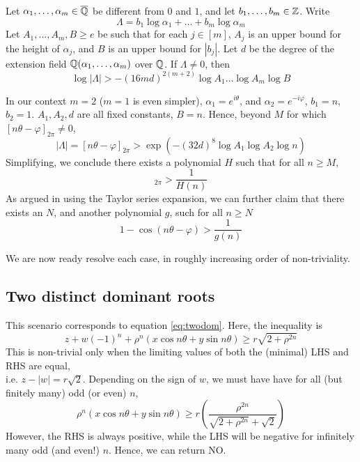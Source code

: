 \begin{theorem}[Baker]
\label{thm:baker}
Let $\alpha_1, \dots, \alpha_m \in \overline{\mathbb{Q}}$ be different from $0$ and $1$, and let $b_1, \dots, b_m \in \mathbb{Z}$. Write
$$
\Lambda = b_1 \log \alpha_1 + \dots + b_m \log \alpha_m
$$
Let $A_1, \dots, A_m, B \ge e$ be such that for each $j \in [m]$, $A_j$ is an upper bound for the height of $\alpha_j$, and $B$ is an upper bound for $|b_j|$. Let $d$ be the degree of the extension field $\mathbb{Q}(\alpha_1, \dots, \alpha_m)$ over $\mathbb{Q}$. If $\Lambda \ne 0$, then
$$
\log |\Lambda| > -(16md)^{2(m+2)}\log A_1 \dots \log A_m \log B
$$  
\end{theorem}

In our context $m=2$ ($m=1$ is even simpler), $\alpha_1 = e^{i\theta}$, and $\alpha_2 = e^{-i\varphi}$, $b_1 = n$, $b_2 = 1$. $A_1, A_2, d$ are all fixed constants, $B = n$. Hence, beyond $M$ for which $[n\theta - \varphi]_{2\pi} \ne 0$,
\begin{equation}
|\Lambda| = [n\theta - \varphi]_{2\pi} > \exp(-(32d)^8 \log A_1 \log A_2 \log n)
\end{equation}
Simplifying, we conclude there exists a polynomial $H$ such that for all $n \ge M$,
\begin{equation}
[n\theta - \varphi]_{2\pi} > \frac{1}{H(n)}
\end{equation}
As argued in \cite{joeljames3} using the Taylor series expansion, we can further claim that there exists an $N$, and another polynomial $g$, such for all $n \ge N$
\begin{equation}
\label{eq:baker}
1 - \cos(n\theta - \varphi) > \frac{1}{g(n)}
\end{equation}

We are now ready resolve each case, in roughly increasing order of non-triviality. 

\subsection{Two distinct dominant roots}
This scenario corresponds to equation \ref{eq:twodom}. Here, the inequality is
\begin{equation}
z + w(-1)^n + \rho^n(x \cos n\theta + y \sin n\theta) \ge r\sqrt{2 + \rho^{2n}}
\end{equation}
This is non-trivial only when the limiting values of both the (minimal) LHS and RHS are equal, \\i.e. $z - |w|= r\sqrt{2}$. Depending on the sign of $w$, we must have have for all (but finitely many) odd (or even) $n$,
\begin{equation}
\rho^n(x \cos n\theta + y \sin n\theta) \ge r\left(\frac{\rho^{2n}}{\sqrt{2 + \rho^{2n}} + \sqrt{2}}\right)
\end{equation}
However, the RHS is always positive, while the LHS will be negative for infinitely many odd (and even!) $n$. Hence, we can return NO.


